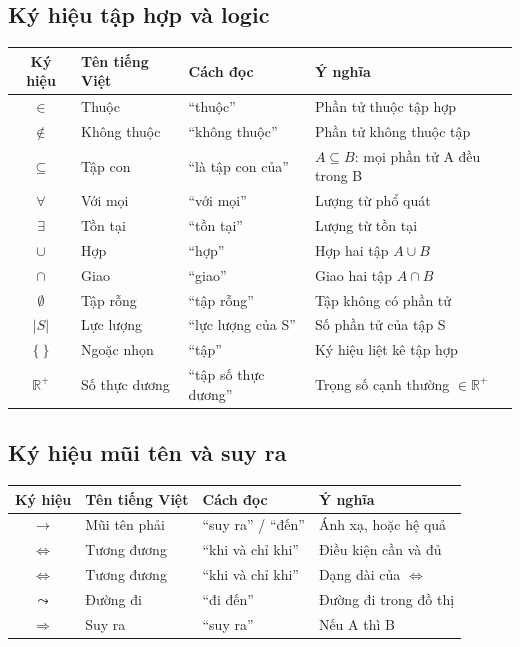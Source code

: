 \documentclass[10pt]{article}
\begin{document}
\subsection{Ký hiệu tập hợp và logic}

\begin{center}
\begin{tabular}{|c|l|l|l|}
\hline
\textbf{Ký hiệu} & \textbf{Tên tiếng Việt} & \textbf{Cách đọc} & \textbf{Ý nghĩa} \\
\hline
$\in$ & Thuộc & ``thuộc'' & Phần tử thuộc tập hợp \\
\hline
$\notin$ & Không thuộc & ``không thuộc'' & Phần tử không thuộc tập \\
\hline
$\subseteq$ & Tập con & ``là tập con của'' & $A \subseteq B$: mọi phần tử A đều trong B \\
\hline
$\forall$ & Với mọi & ``với mọi'' & Lượng từ phổ quát \\
\hline
$\exists$ & Tồn tại & ``tồn tại'' & Lượng từ tồn tại \\
\hline
$\cup$ & Hợp & ``hợp'' & Hợp hai tập $A \cup B$ \\
\hline
$\cap$ & Giao & ``giao'' & Giao hai tập $A \cap B$ \\
\hline
$\emptyset$ & Tập rỗng & ``tập rỗng'' & Tập không có phần tử \\
\hline
$|S|$ & Lực lượng & ``lực lượng của S'' & Số phần tử của tập S \\
\hline
$\{~\}$ & Ngoặc nhọn & ``tập'' & Ký hiệu liệt kê tập hợp \\
\hline
$\mathbb{R}^+$ & Số thực dương & ``tập số thực dương'' & Trọng số cạnh thường $\in \mathbb{R}^+$ \\
\hline
\end{tabular}
\end{center}

\subsection{Ký hiệu mũi tên và suy ra}

\begin{center}
\begin{tabular}{|c|l|l|l|}
\hline
\textbf{Ký hiệu} & \textbf{Tên tiếng Việt} & \textbf{Cách đọc} & \textbf{Ý nghĩa} \\
\hline
$\to$ & Mũi tên phải & ``suy ra'' / ``đến'' & Ánh xạ, hoặc hệ quả \\
\hline
$\Leftrightarrow$ & Tương đương & ``khi và chỉ khi'' & Điều kiện cần và đủ \\
\hline
$\Longleftrightarrow$ & Tương đương & ``khi và chỉ khi'' & Dạng dài của $\Leftrightarrow$ \\
\hline
$\leadsto$ & Đường đi & ``đi đến'' & Đường đi trong đồ thị \\
\hline
$\Rightarrow$ & Suy ra & ``suy ra'' & Nếu A thì B \\
\hline
\end{tabular}
\end{center}
\end{document}

